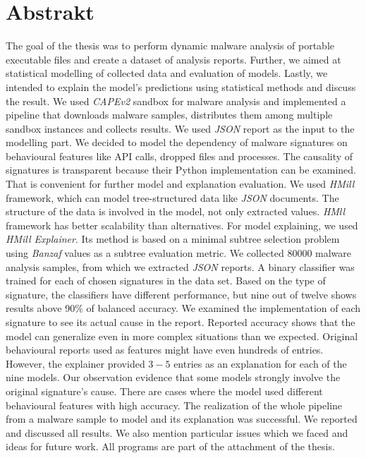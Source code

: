 \documentclass[11pt,twoside,a4paper]{book}
\begin{document}
	\let\cleardoublepage\clearpage

	\noindent
	\chapter*{Abstrakt}
	\noindent
The goal of the thesis was to perform dynamic malware analysis of portable executable files and create a dataset of analysis reports. Further, we aimed at statistical modelling of collected data and evaluation of models. Lastly, we intended to explain the model's predictions using statistical methods and discuss the result. We used \emph{CAPEv2} sandbox for malware analysis and implemented a pipeline that downloads malware samples, distributes them among multiple sandbox instances and collects results. We used \emph{JSON} report as the input to the modelling part. We decided to model the dependency of malware signatures on behavioural features like API calls, dropped files and processes. The causality of signatures is transparent because their Python implementation can be examined. That is convenient for further model and explanation evaluation. We used \emph{HMill} framework, which can model tree-structured data like \emph{JSON} documents. The structure of the data is involved in the model, not only extracted values. \emph{HMll} framework has better scalability than alternatives. For model explaining, we used \emph{HMill Explainer}. Its method is based on a minimal subtree selection problem using \emph{Banzaf} values as a subtree evaluation metric. We collected $80000$ malware analysis samples, from which we extracted \emph{JSON} reports. A binary classifier was trained for each of chosen signatures in the data set. Based on the type of signature, the classifiers have different performance, but nine out of twelve shows results above 90\% of balanced accuracy. We examined the implementation of each signature to see its actual cause in the report. Reported accuracy shows that the model can generalize even in more complex situations than we expected. Original behavioural reports used as features might have even hundreds of entries. However, the explainer provided $3-5$ entries as an explanation for each of the nine models. Our observation evidence that some models strongly involve the original signature's cause. There are cases where the model used different behavioural features with high accuracy. The realization of the whole pipeline from a malware sample to model and its explanation was successful. We reported and discussed all results. We also mention particular issues which we faced and ideas for future work. All programs are part of the attachment of the thesis.
\end{document}
